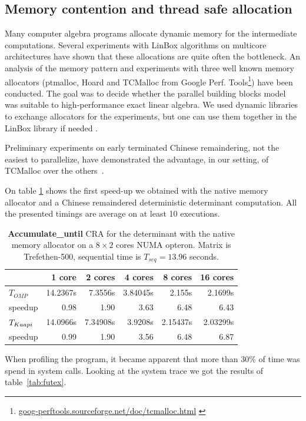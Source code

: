 \documentclass{article}
\newcommand{\linbox}{{\sc LinBox}\xspace}
\newcommand{\kaapi}{{\sc Kaapi}\xspace}
\newcommand{\Accumulatewhile}{ \textbf{Accumulate\_until} }
\begin{document}
\subsection{Memory contention and thread safe allocation}
Many computer algebra programs allocate dynamic memory for the
intermediate computations. Several experiments with \linbox
algorithms on multicore architectures have shown that these
allocations are quite often the bottleneck.
An analysis of the memory pattern and experiments with three well
known memory allocators 
(ptmalloc, Hoard and TCMalloc from Google
Perf.
Tools\footnote{\url{goog-perftools.sourceforge.net/doc/tcmalloc.html}
  \cite{tcmalloc}})
have been conducted. The goal was to decide whether the parallel
building blocks model was suitable to high-performance exact linear
algebra. We used dynamic libraries to exchange allocators for the
experiments, but one can use them together in the \linbox library if
needed \cite[\S 7]{kaltofen:2005:memory}.

Preliminary experiments on early terminated Chinese remaindering,
not the easiest to parallelize, have demonstrated the advantage, in
our setting, of TCMalloc over the others~\cite{jgd:2010:crt}.

On table \ref{tab:ptmalloc} shows the first speed-up we obtained with
the native memory allocator and a Chinese remaindered deterministic
determinant computation. All the presented timings are average on at
least 10 executions.

\begin{table}[htb]\center
\begin{tabular}{|l||r|r|r|r|r|}
\hline
& 1 core & 2 cores & 4 cores & 8 cores & 16 cores\\
\hline
$T_{OMP}$ &14.2367s& 7.3556s& 3.84045s& 2.155s& 2.1699s\\
speedup& 0.98& 1.90& 3.63& 6.48& 6.43\\
\hline
$T_{\kaapi}$ & 14.0966s& 7.34908s& 3.9208s& 2.15437s& 2.03299s\\
speedup& 0.99& 1.90& 3.56& 6.48& 6.87\\
\hline
\end{tabular}
\caption{\Accumulatewhile CRA for the determinant with the native
  memory allocator on a $8\times 2$ cores NUMA opteron. Matrix is
  Trefethen-500, sequential time is $T_{seq}=13.96$ seconds.
}\label{tab:ptmalloc}
\end{table}

When profiling the program, it became apparent that more than 30\% of
time was spend in system calls. Looking at the system trace we got the
results of table~\ref{tab:futex}.
\end{document}
